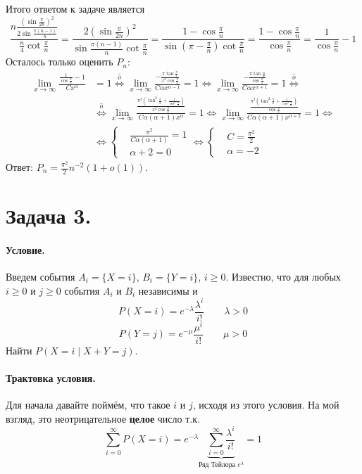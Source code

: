 \documentclass{article}
\begin{document}
    Итого ответом к задаче является
    $$
    \frac{n\frac{\left(\sin\frac{\pi}{2n}\right)^2}{2\sin\frac{\pi(n-1)}n}}{\frac n4\cot\frac\pi n}=\frac{2\left(\sin\frac{\pi}{2n}\right)^2}{\sin\frac{\pi(n-1)}n\cot\frac\pi n}=\frac{1-\cos\frac\pi n}{\sin\left(\pi-\frac\pi n\right)\cot\frac\pi n}=\frac{1-\cos\frac\pi n}{\cos\frac\pi n}=\frac1{\cos\frac\pi n}-1
    $$
    Осталось только оценить $P_n$:
    \[\begin{split}
        \lim\limits_{x\to\infty}\frac{\frac1{\cos\frac\pi x}-1}{Cx^\alpha}&=1\overset{\hat o}\Leftrightarrow
        \lim\limits_{x\to\infty}\frac{-\frac{\pi\tan\frac\pi x}{x^2\cos\frac\pi x}}{C\alpha x^{\alpha-1}}=1\Leftrightarrow
        \lim\limits_{x\to\infty}\frac{-\frac{\pi\tan\frac\pi x}{\cos\frac\pi x}}{C\alpha x^{\alpha+1}}=1\overset{\hat o}\Leftrightarrow\\
        &\overset{\hat o}\Leftrightarrow
        \lim\limits_{x\to\infty}\frac{\frac{\pi^2\left(\tan^2\frac\pi x+\frac1{\cos^2\frac\pi x}\right)}{x^2\cos\frac\pi x}}{C\alpha(\alpha+1) x^{\alpha}}=1\Leftrightarrow
        \lim\limits_{x\to\infty}\frac{\frac{\pi^2\left(\tan^2\frac\pi x+\frac1{\cos^2\frac\pi x}\right)}{\cos\frac\pi x}}{C\alpha(\alpha+1) x^{\alpha+2}}=1\Leftrightarrow\\
        &\Leftrightarrow
        \left\{\begin{aligned}
            &\frac{\pi^2}{C\alpha(\alpha+1)}=1\\&\alpha+2=0
        \end{aligned}\right.
        \Leftrightarrow
        \left\{\begin{aligned}
            &C=\frac{\pi^2}2\\&\alpha=-2
        \end{aligned}\right.
    \end{split}\]
    Ответ: $P_n=\frac{\pi^2}2n^{-2}(1+o(1))$.
    \section{Задача 3.}
    \paragraph{Условие.}
    Введем события $A_i=\{X=i\}$, $B_i=\{Y=i\}$, $i\geqslant0$. Известно, что для любых $i\geqslant0$ и $j\geqslant0$ события $A_i$ и $B_i$ независимы и
    $$
    P(X=i)=e^{-\lambda}\frac{\lambda^i}{i!}\qquad \lambda>0
    $$
    $$
    P(Y=j)=e^{-\mu}\frac{\mu^i}{i!}\qquad \mu>0
    $$
    Найти $P(X=i\mid X+Y=j)$.
    \paragraph{Трактовка условия.}
    Для начала давайте поймём, что такое $i$ и $j$, исходя из этого условия. На мой взгляд, это неотрицательное \textbf{целое} число т.к.
    $$
    \sum\limits_{i=0}^\infty P(X=i)=e^{-\lambda}\underbrace{\sum\limits_{i=0}^\infty \frac{\lambda^i}{i!}}_{\text{Ряд Тейлора }e^{\lambda}}=1
    $$
\end{document}
